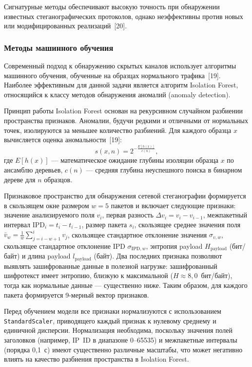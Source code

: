 Сигнатурные методы обеспечивают высокую точность при обнаружении известных стеганографических протоколов, однако неэффективны против новых или модифицированных реализаций~[20].

\subsubsection{Методы машинного обучения}

Современный подход к обнаружению скрытых каналов использует алгоритмы машинного обучения, обученные на образцах нормального трафика~[19]. Наиболее эффективным для данной задачи является алгоритм Isolation Forest, относящийся к классу методов обнаружения аномалий (anomaly detection).

Принцип работы Isolation Forest основан на рекурсивном случайном разбиении пространства признаков. Аномалии, будучи редкими и отличными от нормальных точек, изолируются за меньшее количество разбиений. Для каждого образца $x$ вычисляется оценка аномальности~[19]:
\begin{equation}
s(x, n) = 2^{-\frac{E[h(x)]}{c(n)}},
\label{eq:isolation_forest}
\end{equation}
где $E[h(x)]$ --- математическое ожидание глубины изоляции образца $x$ по ансамблю деревьев, $c(n)$ --- средняя глубина неуспешного поиска в бинарном дереве для $n$ образцов.

Признаковое пространство для обнаружения сетевой стеганографии формируется в скользящем окне размером $w = 5$ пакетов и включает следующие признаки: значение анализируемого поля $v_i$, первая разность $\Delta v_i = v_i - v_{i-1}$, межпакетный интервал $\text{IPD}_i = t_i - t_{i-1}$, размер пакета $s_i$, скользящее среднее значения поля $\bar{v}_w = \frac{1}{w}\sum_{j=i-w+1}^{i} v_j$, скользящее стандартное отклонение значения $\sigma_{v,w}$, скользящее стандартное отклонение IPD $\sigma_{\text{IPD},w}$, энтропия payload $H_{\text{payload}}$ (бит/байт) и длина payload $l_{\text{payload}}$ (байт). Два последних признака позволяют выявлять зашифрованные данные в полезной нагрузке: зашифрованный шифротекст имеет энтропию, близкую к максимальной ($H \approx 8{,}0$~бит/байт), тогда как нормальные данные --- существенно ниже. Таким образом, для каждого пакета формируется 9-мерный вектор признаков.

Перед обучением модели все признаки нормализуются с использованием \texttt{StandardScaler}, приводящего каждый признак к нулевому среднему и единичной дисперсии. Нормализация необходима, поскольку значения полей заголовков (например, IP~ID в диапазоне 0--65535) и межпакетные интервалы (порядка 0{,}1~с) имеют существенно различные масштабы, что может негативно влиять на качество разбиения пространства в Isolation Forest.

